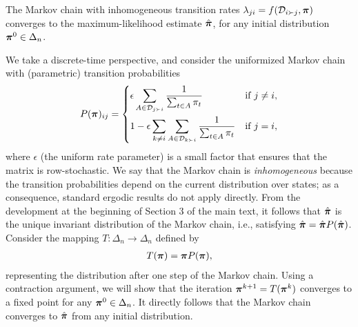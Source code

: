 \begin{theorem}
\label{fix:thm:convergence}
The Markov chain with inhomogeneous transition rates $\lambda_{ji} = f(\mathcal{D}_{i \succ j}, \bm{\pi})$ converges to the maximum-likelihood estimate $\hat{\bm{\pi}}$, for any initial distribution $\bm{\pi}^0 \in \Delta_n$.
\end{theorem}

We take a discrete-time perspective, and consider the uniformized Markov chain with (parametric) transition probabilities
\begin{align}
  P(\bm{\pi})_{ij} =
  \begin{dcases}
    \epsilon \sum_{A \in \mathcal{D}_{j \succ i}} \frac{1}{\sum_{t \in A} \pi_t}              & \text{if } j \ne i, \\
    1 - \epsilon \sum_{k \ne i}\sum_{A \in \mathcal{D}_{k \succ i}} \frac{1}{\sum_{t \in A} \pi_t}  & \text{if } j = i,
  \end{dcases}
\end{align}
where $\epsilon$ (the uniform rate parameter) is a small factor that ensures that the matrix is row-stochastic.
We say that the Markov chain is \emph{inhomogeneous} because the transition probabilities depend on the current distribution over states;
as a consequence, standard ergodic results do not apply directly.
From the development at the beginning of Section 3 of the main text, it follows that $\hat{\bm{\pi}}$ is the unique invariant distribution of the Markov chain, i.e., satisfying $\hat{\bm{\pi}} = \hat{\bm{\pi}} P(\hat{\bm{\pi}})$.
Consider the mapping $T: \Delta_n \to \Delta_n$ defined by
\begin{align}
\label{fix:eq:mapping}
T(\bm{\pi}) = \bm{\pi} P(\bm{\pi}),
\end{align}
representing the distribution after one step of the Markov chain.
Using a contraction argument, we will show that the iteration $\bm{\pi}^{k+1} = T(\bm{\pi}^k)$ converges to a fixed point for any $\bm{\pi}^0 \in \Delta_n$.
It directly follows that the Markov chain converges to $\hat{\bm{\pi}}$ from any initial distribution.


